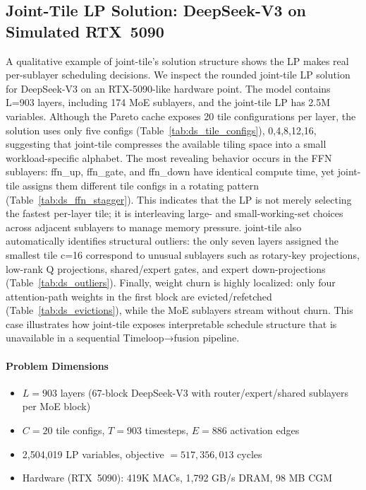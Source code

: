 \subsection{Joint-Tile LP Solution: DeepSeek-V3 on Simulated RTX~5090}\label{app:tiling_deepseek}
A qualitative example of joint-tile's solution structure shows the LP makes real per-sublayer scheduling decisions.
We inspect the rounded joint-tile LP solution for DeepSeek-V3 on an RTX-5090-like hardware point.
The model contains L=903 layers, including 174 MoE sublayers, and the joint-tile LP has 2.5M variables.
Although the Pareto cache exposes 20 tile configurations per layer, the solution uses only five configs (Table~\ref{tab:ds_tile_configs}), {0,4,8,12,16}, suggesting that joint-tile compresses the available tiling space into a small workload-specific alphabet.
The most revealing behavior occurs in the FFN sublayers: ffn\_up, ffn\_gate, and ffn\_down have identical compute time, yet joint-tile assigns them different tile configs in a rotating pattern (Table~\ref{tab:ds_ffn_stagger}).
This indicates that the LP is not merely selecting the fastest per-layer tile; it is interleaving large- and small-working-set choices across adjacent sublayers to manage memory pressure. joint-tile also automatically identifies structural outliers: the only seven layers assigned the smallest tile c=16 correspond to unusual sublayers such as rotary-key projections, low-rank Q projections, shared/expert gates, and expert down-projections (Table~\ref{tab:ds_outliers}).
Finally, weight churn is highly localized: only four attention-path weights in the first block are evicted/refetched (Table~\ref{tab:ds_evictions}), while the MoE sublayers stream without churn.
This case illustrates how joint-tile exposes interpretable schedule structure that is unavailable in a sequential Timeloop→fusion pipeline.

\paragraph{Problem Dimensions}

\begin{itemize}[leftmargin=1.4em, itemsep=2pt]
    \item $L = 903$ layers (67-block DeepSeek-V3 with
          router/expert/shared sublayers per MoE block)
    \item $C = 20$ tile configs, $T = 903$ timesteps,
          $E = 886$ activation edges
    \item 2{,}504{,}019 LP variables,
          objective $= 517{,}356{,}013$ cycles
    \item Hardware (RTX~5090): 419K MACs, 1{,}792 GB/s DRAM,
          98 MB CGM
\end{itemize}

